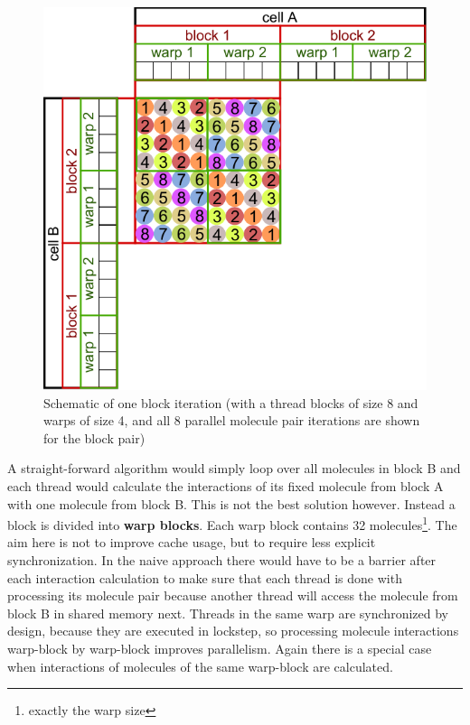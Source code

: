 \begin{figure}
\caption{Schematic of one block iteration (with a thread blocks of size 8 and warps of size 4, and all 8 parallel molecule pair iterations are shown for the block pair)}
\centering
\includegraphics{figures/cellprocessor_block_iteration_1.pdf}
\end{figure}

A straight-forward algorithm would simply loop over all molecules in block B and each thread would calculate the interactions of its fixed molecule from block A with one molecule from block B.
This is not the best solution however. Instead a block is divided into \textbf{warp blocks}. Each warp block contains 32 molecules\footnote{exactly the warp size}.
The aim here is not to improve cache usage, but to require less explicit synchronization.
In the naive approach there would have to be a barrier after each interaction calculation to make sure that each thread is done with processing its molecule pair because another thread will access the molecule from block B in shared memory next.
Threads in the same warp are synchronized by design, because they are executed in lockstep, so processing  molecule interactions warp-block by warp-block improves parallelism.
Again there is a special case when interactions of molecules of the same warp-block are calculated.

